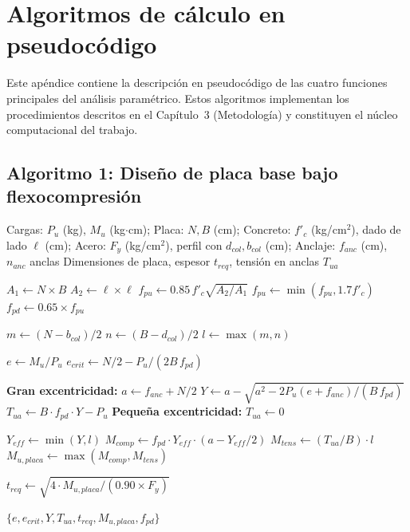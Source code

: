 \chapter{Algoritmos de cálculo en pseudocódigo}
\label{ch:apendiceC}

Este apéndice contiene la descripción en pseudocódigo de las cuatro funciones principales del
análisis paramétrico. Estos algoritmos implementan los procedimientos descritos en el Capítulo~3
(Metodología) y constituyen el núcleo computacional del trabajo.
\section{Algoritmo 1: Diseño de placa base bajo flexocompresión}

\begin{algorithm}[H]
  \caption{\textbf{diseñar\_placa\_base}$(P_u, M_u, N, B, f_c, F_y, d_{col}, b_{col},
           \text{lado\_dado}, f_{anc}, n_{anc})$}
  \label{alg:placa_base}
  \begin{algorithmic}[1]
    \Require Cargas: $P_u$ (kg), $M_u$ (kg$\cdot$cm);
             Placa: $N, B$ (cm);
             Concreto: $f'_c$ (kg/cm$^2$), dado de lado $\ell$ (cm);
             Acero: $F_y$ (kg/cm$^2$), perfil con $d_{col}, b_{col}$ (cm);
             Anclaje: $f_{anc}$ (cm), $n_{anc}$ anclas
    \Ensure Dimensiones de placa, espesor $t_{req}$, tensión en anclas $T_{ua}$

    \State $A_1 \gets N \times B$ \quad $A_2 \gets \ell \times \ell$
    \State $f_{pu} \gets 0.85\,f'_c\sqrt{A_2/A_1}$ \quad $f_{pu} \gets \min(f_{pu}, 1.7f'_c)$
    \State $f_{pd} \gets 0.65 \times f_{pu}$ \quad \quad\quad\quad\quad\quad\quad

    \State $m \gets (N - b_{col})/2$ \quad $n \gets (B - d_{col})/2$ \quad $l \gets \max(m, n)$

    \State $e \gets M_u / P_u$
    \State $e_{crit} \gets N/2 - P_u/(2B\,f_{pd})$

      \State \textbf{Gran excentricidad:}
      \State $a \gets f_{anc} + N/2$
      \State $Y \gets a - \sqrt{a^2 - 2P_u(e + f_{anc})/(B\,f_{pd})}$
      \State $T_{ua} \gets B \cdot f_{pd} \cdot Y - P_u$
    \Else
      \State \textbf{Pequeña excentricidad:} $T_{ua} \gets 0$
    \EndIf

    \State $Y_{eff} \gets \min(Y, l)$
    \State $M_{comp} \gets f_{pd} \cdot Y_{eff} \cdot (a - Y_{eff}/2)$
    \State $M_{tens} \gets (T_{ua}/B) \cdot l$
    \State $M_{u,placa} \gets \max(M_{comp}, M_{tens})$

    \State $t_{req} \gets \sqrt{4 \cdot M_{u,placa}/(0.90 \times F_y)}$

    \Return $\{e, e_{crit}, Y, T_{ua}, t_{req}, M_{u,placa}, f_{pd}\}$
  \end{algorithmic}
\end{algorithm}

